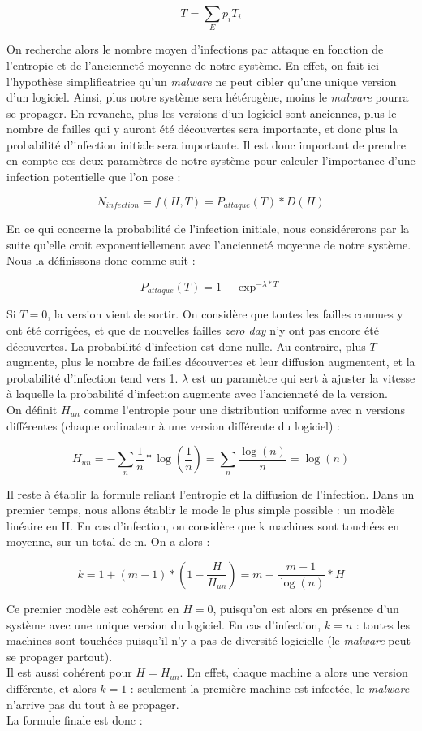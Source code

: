\[
T=\sum_E p_i T_i
\]

On recherche alors le nombre moyen d'infections par attaque en fonction de l'entropie et de l'ancienneté moyenne de notre système. En effet, on fait ici l'hypothèse simplificatrice qu'un \textit{malware} ne peut cibler qu'une unique version d'un logiciel. Ainsi, plus notre système sera hétérogène, moins le \textit{malware} pourra se propager. En revanche, plus les versions d'un logiciel sont anciennes, plus le nombre de failles qui y auront été découvertes sera importante, et donc plus la probabilité d'infection initiale sera importante. Il est donc important de prendre en compte ces deux paramètres de notre système pour calculer l'importance d'une infection potentielle que l'on pose : 

\[
N_{infection} = f(H,T) = P_{attaque}(T)*D(H)
\]

En ce qui concerne la probabilité de l'infection initiale, nous considérerons par la suite qu'elle croit exponentiellement avec l'ancienneté moyenne de notre système. Nous la définissons donc comme suit :

\[
P_{attaque}(T) =1- \exp^{-\lambda*T}
\]

Si $T=0$, la version vient de sortir. On considère que toutes les failles connues y ont été corrigées, et que de nouvelles failles \textit{zero day} n'y ont pas encore été découvertes. La probabilité d'infection est donc nulle. Au contraire, plus $T$ augmente, plus le nombre de failles découvertes et leur diffusion augmentent, et la probabilité d'infection tend vers 1. $\lambda$ est un paramètre qui sert à ajuster la vitesse à laquelle la probabilité d'infection augmente avec l'ancienneté de la version.\\

On définit $H_{un}$ comme l'entropie pour une distribution uniforme avec n versions différentes (chaque ordinateur à une version différente du logiciel) :

\[
H_{un} = -\sum_n \frac{1}{n} * \log(\frac{1}{n}) = \sum_n \frac{\log(n)}{n} = \log(n)
\]

Il reste à établir la formule reliant l'entropie et la diffusion de l'infection. Dans un premier temps, nous allons établir le mode le plus simple possible : un modèle linéaire en H. En cas d'infection, on considère que k machines sont touchées en moyenne, sur un total de m. On a alors :

\[
k=1+(m-1)*(1-\frac{H}{H_{un}}) =m-\frac{m-1}{\log(n)}*H
\]

Ce premier modèle est cohérent en $H=0$, puisqu'on est alors en présence d'un système avec une unique version du logiciel. En cas d'infection, $k=n$ : toutes les machines sont touchées puisqu'il n'y a pas de diversité logicielle (le \textit{malware} peut se propager partout).\\
Il est aussi cohérent pour $H=H_{un}$. En effet, chaque machine a alors une version différente, et alors $k=1$ : seulement la première machine est infectée, le \textit{malware} n'arrive pas du tout à se propager.\\
La formule finale est donc :


